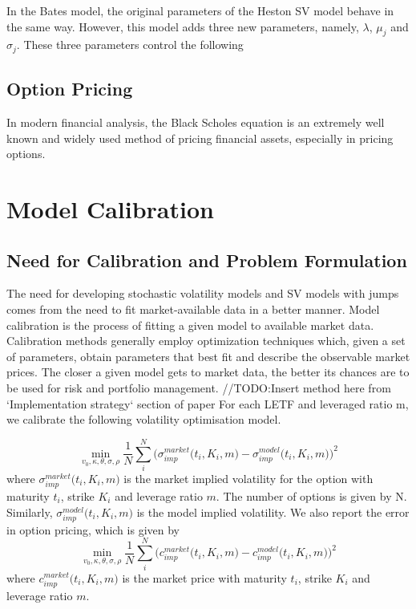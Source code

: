 \documentclass{article}
\begin{document}
In the Bates model, the original parameters of the Heston SV model behave in the same way. However, this model adds three new parameters, namely, $\lambda$, $\mu_j$ and $\sigma_j$. These three parameters control the following

\subsection{Option Pricing}
In modern financial analysis, the Black Scholes equation is an extremely well known and widely used method of pricing financial assets, especially in pricing options. 
\section{Model Calibration}
\subsection{Need for Calibration and Problem Formulation}
The need for developing stochastic volatility models and SV models with jumps comes from the need to fit market-available data in a better manner. Model calibration is the process of fitting a given model to available market data. Calibration methods generally employ optimization techniques which, given a set of parameters, obtain parameters that best fit and describe the observable market prices. The closer a given model gets to market data, the better its chances are to be used for risk and portfolio management. 
\newline\newline
//TODO:Insert method here from `Implementation strategy` section of paper
For each LETF and leveraged ratio m, we calibrate the following volatility optimisation model.

\begin{equation}
    \min_{v_{0},\kappa,\theta,\sigma,\rho}\frac{1}{N}\sum_{i}^{N}\big(\sigma_{imp}^{market}\big(t_{i},K_{i},m\big) - \sigma_{imp}^{model}\big(t_{i},K_{i},m\big)\big)^2
\end{equation}
where $\sigma_{imp}^{market}\big(t_{i},K_{i},m\big)$ is the market implied volatility for the option with maturity $t_i$, strike $K_i$ and leverage ratio $m$. The number of options is given by N. Similarly, $\sigma_{imp}^{model}\big(t_{i},K_{i},m\big)$ is the model implied volatility. We also report the error in option pricing, which is given by
\begin{equation}
    \min_{v_{0},\kappa,\theta,\sigma,\rho}\frac{1}{N}\sum_{i}^{N}\big(c_{imp}^{market}\big(t_{i},K_{i},m\big) - c_{imp}^{model}\big(t_{i},K_{i},m\big)\big)^2
\end{equation}
where $c_{imp}^{market}\big(t_{i},K_{i},m\big)$ is the market price with maturity $t_i$, strike $K_i$ and leverage ratio $m$.
\end{document}
